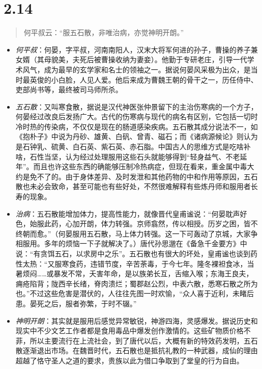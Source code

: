 \documentclass[]{book}
\providecommand{\tightlist}{%
  \setlength{\itemsep}{0pt}\setlength{\parskip}{0pt}}
\begin{document}
\section{2.14}\label{section-60}

\begin{quote}
何平叔云：``服五石散，非唯治病，亦觉神明开朗。''
\end{quote}

\begin{itemize}
\tightlist
\item
  \emph{何平叔}：何晏，字平叔，河南南阳人，汉末大将军何进的孙子，曹操的养子兼女婿（其母貌美，夫死后被曹操收纳为妻妾）。他勤于专研老庄，引导一代学术风气，成为最早的玄学家和名士的领袖之一。据说何晏风采极为出众，是当时最英俊的小白脸，人见人爱。他后来成为曹魏王朝的骨干之一，历任侍中、吏部尚书等，最终被司马师所杀。
\item
  \emph{五石散}：又叫寒食散，据说是汉代神医张仲景留下的主治伤寒病的一个方子，何晏经过改良后发扬广大。古代的伤寒病与现代的病名有区别，它包括一切时冷时热的传染病，不仅仅是现在的肠道感染疾病。五石散其成分说法不一，如《抱朴子》中说为丹砂、雄黄、白矾、曾青、磁石；而《诸病源候论》则认为是石钟乳、硫黄、白石英、紫石英、赤石脂。中国古人的思维方式是吃啥补啥，石性当坚，认为经过处理服用这些石头就能够得到``轻身益气、不老延年''。而且也许这些东西的确能够压制冷热病症，但现在看来，重金属中毒大约是免不了的。由于身体差异、及时发泄和其他药物的中和作用等原因，五石散也未必会致命，甚至可能也有些好处，不然很难解释有些炼丹师和服用者长寿的现象。
\item
  \emph{治病}：五石散能增加体力，提高性能力，就像晋代皇甫谧说：``何晏耽声好色，始服此药，心加开朗，体力转强。京师翕然，传以相授。历岁之困，皆不终朝而愈。''（何晏服用五石散，马上体力转强。这一下可轰动了京城，大家争相服用。多年的烦恼一下子就解决了。）唐代孙思邈在《备急千金要方》中说：``有贪饵五石，以求房中之乐''。五石散也有很大的坏处，皇甫谧也谈到药性太热：``又服寒食药，违错节度，辛苦荼毒，于今七年。隆冬裸袒食冰，当暑烦闷\ldots{}\ldots{}或暴发不常，夭害年命，是以族弟长互，舌缩入喉；东海王良夫，痈疮陷背；陇西辛长绪，脊肉溃烂；蜀郡赵公烈，中表六散，悉寒石散之所为也。''不过这些危害是潜伏的，人往往先图一时欢愉，``众人喜于近利，未睹后患。晏死之后，服者弥繁，于时不辍。''
\item
  \emph{神明开朗}：其实就是服用后感觉异常敏锐，神游四海，灵感爆发。据说历史和现实中不少文艺工作者都是食用毒品中爆发创作激情的。这些矿物质价格不菲，所以主要流行在上流社会，到了唐代以后，大概有新的特效药发明，五石散逐渐退出市场。在魏晋时代，五石散也是抵抗礼教的一种武器，成仙的理由超越了恪守圣人之道的要求，贵族以此为借口争取到了堂皇的行为自由。
\end{itemize}
\end{document}
